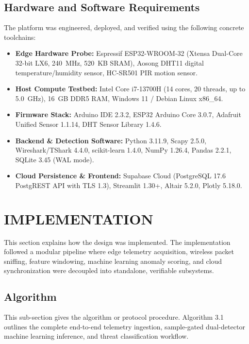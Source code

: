 \documentclass[11pt,a4paper]{report}
\begin{document}
\subsection{Hardware and Software Requirements}
The platform was engineered, deployed, and verified using the following concrete toolchains:
\begin{itemize}[leftmargin=*,itemsep=1.5pt,parsep=0pt,topsep=2pt]
    \item \textbf{Edge Hardware Probe:} Espressif ESP32-WROOM-32 (Xtensa Dual-Core 32-bit LX6, 240~MHz, 520~KB SRAM), Aosong DHT11 digital temperature/humidity sensor, HC-SR501 PIR motion sensor.
    \item \textbf{Host Compute Testbed:} Intel Core i7-13700H (14 cores, 20 threads, up to 5.0~GHz), 16~GB DDR5 RAM, Windows 11 / Debian Linux x86\_64.
    \item \textbf{Firmware Stack:} Arduino IDE 2.3.2, ESP32 Arduino Core 3.0.7, Adafruit Unified Sensor 1.1.14, DHT Sensor Library 1.4.6.
    \item \textbf{Backend \& Detection Software:} Python 3.11.9, Scapy 2.5.0, Wireshark/TShark 4.4.0, scikit-learn 1.4.0, NumPy 1.26.4, Pandas 2.2.1, SQLite 3.45 (WAL mode).
    \item \textbf{Cloud Persistence \& Frontend:} Supabase Cloud (PostgreSQL 17.6 PostgREST API with TLS 1.3), Streamlit 1.30+, Altair 5.2.0, Plotly 5.18.0.
\end{itemize}

\section{IMPLEMENTATION}
This section explains how the design was implemented. The implementation followed a modular pipeline where edge telemetry acquisition, wireless packet sniffing, feature windowing, machine learning anomaly scoring, and cloud synchronization were decoupled into standalone, verifiable subsystems.

\subsection{Algorithm}
This sub-section gives the algorithm or protocol procedure. Algorithm 3.1 outlines the complete end-to-end telemetry ingestion, sample-gated dual-detector machine learning inference, and threat classification workflow.
\end{document}
